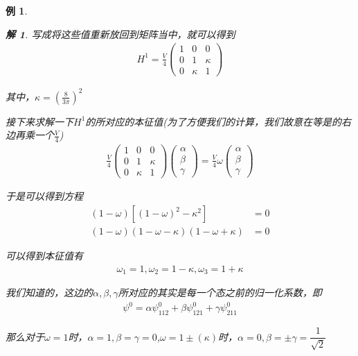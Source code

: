 \documentclass{article}
\newtheorem{example}{例}
\newtheorem{solution}{解}
\begin{document}
\begin{example}
\begin{solution}
		写成将这些值重新放回到矩阵当中，就可以得到
		\begin{align*}
			H^1=\frac{V}{4}
			\begin{pmatrix}
				1 & 0      & 0      \\
				0 & 1      & \kappa \\
				0 & \kappa & 1
			\end{pmatrix}
		\end{align*}

		其中，$\displaystyle\kappa=\left(\frac{8}{3\pi}\right)^2$

		接下来求解一下$H^1$的所对应的本征值(为了方便我们的计算，我们故意在等是的右边再乘一个$\displaystyle\frac{V}{4}$)
		\begin{align*}
			\frac{V}{4}
			\begin{pmatrix}
				1 & 0      & 0      \\
				0 & 1      & \kappa \\
				0 & \kappa & 1
			\end{pmatrix}
			\begin{pmatrix}
				\alpha \\\beta\\\gamma
			\end{pmatrix}
			=
			\frac{V}{4}\omega
			\begin{pmatrix}
				\alpha \\\beta\\\gamma
			\end{pmatrix}
		\end{align*}

		于是可以得到方程
		\begin{align*}
			(1-\omega)\left[(1-\omega)^2-\kappa^2\right] & =0 \\
			(1-\omega)(1-\omega-\kappa)(1-\omega+\kappa) & =0
		\end{align*}

		可以得到本征值有
		\begin{align*}
			\omega_1=1,\omega_2=1-\kappa,\omega_3=1+\kappa
		\end{align*}

		我们知道的，这边的$\alpha,\beta,\gamma$所对应的其实是每一个态之前的归一化系数，即
		\begin{align*}
			\psi^0=\alpha\psi_{112}^0+\beta\psi_{121}^0+\gamma\psi_{211}^0
		\end{align*}

		那么对于$\omega=1$时，$\alpha=1,\beta=\gamma=0$,$\omega=1\pm(\kappa)$时，$\alpha=0,\beta=\pm\gamma=\dfrac{1}{\sqrt{2}}$


\end{solution}
\end{example}
\end{document}

